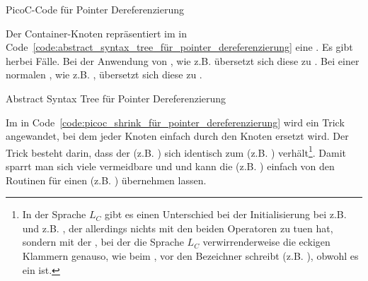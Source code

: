 \begin{code}
  \centering
  \caption{PicoC-Code für Pointer Dereferenzierung}
  \label{code:picoc_code_für_pointer_dereferenzierung}
\end{code}

Der Container-Knoten  repräsentiert im  in Code~\ref{code:abstract_syntax_tree_für_pointer_dereferenzierung} eine  . Es gibt herbei  Fälle. Bei der Anwendung von , wie z.B.  übersetzt sich diese zu . Bei einer normalen , wie z.B. , übersetzt sich diese zu .

\begin{code}
  \centering
  \caption{Abstract Syntax Tree für Pointer Dereferenzierung}
  \label{code:abstract_syntax_tree_für_pointer_dereferenzierung}
\end{code}

Im  in Code~\ref{code:picoc_shrink_für_pointer_dereferenzierung} wird ein Trick angewandet, bei dem jeder Knoten  einfach durch den Knoten  ersetzt wird. Der Trick besteht darin, dass der  (z.B. ) sich identisch zum  (z.B. ) verhält\footnote{In der Sprache $L_{C}$ gibt es einen Unterschied bei der Initialisierung bei z.B.  und z.B. , der allerdings nichts mit den beiden Operatoren zu tuen hat, sondern mit der , bei der die Sprache $L_{C}$ verwirrenderweise die eckigen Klammern \smalltt{[]} genauso, wie beim , vor den Bezeichner schreibt (z.B. ), obwohl es ein  ist.}. Damit sparrt man sich viele vermeidbare  und  und kann die  (z.B. ) einfach von den Routinen für einen  (z.B. ) übernehmen lassen.

